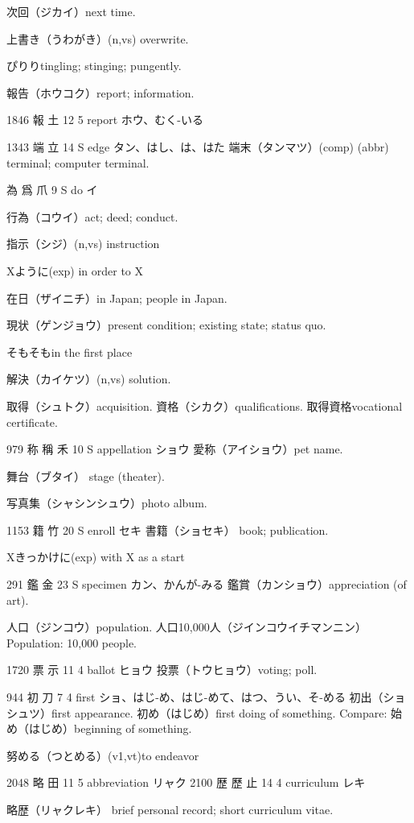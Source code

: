 次回（ジカイ）next time.

上書き（うわがき）(n,vs) overwrite.

ぴりりtingling; stinging; pungently.

報告（ホウコク）report; information.

1846 報  土 12 5  report ホウ、むく-いる

1343 端  立 14 S  edge タン、はし、は、はた
端末（タンマツ）(comp) (abbr) terminal; computer terminal.

為 爲 爪 9 S  do イ

行為（コウイ）act; deed; conduct.

指示（シジ）(n,vs) instruction

Xように(exp) in order to X

在日（ザイニチ）in Japan; people in Japan.

現状（ゲンジョウ）present condition; existing state; status quo.

そもそもin the first place

解決（カイケツ）(n,vs) solution.

取得（シュトク）acquisition.
資格（シカク）qualifications.
取得資格vocational certificate.

979	称	稱	禾	10	S		appellation	ショウ
愛称（アイショウ）pet name.

舞台（ブタイ）
stage (theater).

写真集（シャシンシュウ）photo album.

1153	籍		竹	20	S		enroll	セキ
書籍（ショセキ）
book; publication.

Xきっかけに(exp) with X as a start

291	鑑		金	23	S		specimen	カン、かんが-みる
鑑賞（カンショウ）appreciation (of art).

人口（ジンコウ）population.
人口10,000人（ジインコウイチマンニン）
Population: 10,000 people.

1720	票		示	11	4		ballot	ヒョウ
投票（トウヒョウ）voting; poll.

944	初		刀	7	4		first	ショ、はじ-め、はじ-めて、はつ、うい、そ-める
初出（ショシュツ）first appearance.
初め（はじめ）first doing of something.
Compare: 始め（はじめ）beginning of something.

努める（つとめる）(v1,vt)to endeavor

2048	略		田	11	5		abbreviation	リャク
2100	歴	歷	止	14	4		curriculum	レキ

略歴（リャクレキ）
brief personal record;
short curriculum vitae.

